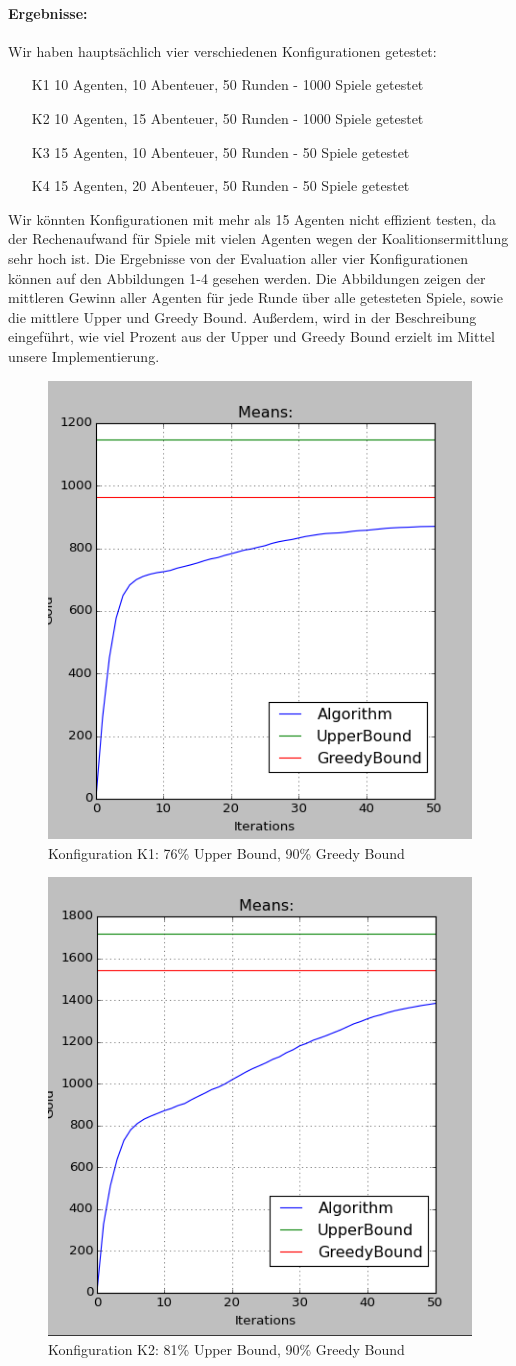 \documentclass[fleqn,10pt]{SelfArx} %
\begin{document}
\paragraph{Ergebnisse:}
Wir haben hauptsächlich vier verschiedenen Konfigurationen getestet:
\begin{itemize}
  \item[K1] 10 Agenten, 10 Abenteuer, 50 Runden - 1000 Spiele getestet
  \item[K2] 10 Agenten, 15 Abenteuer, 50 Runden - 1000 Spiele getestet
  \item[K3] 15 Agenten, 10 Abenteuer, 50 Runden - 50 Spiele getestet
  \item[K4] 15 Agenten, 20 Abenteuer, 50 Runden - 50 Spiele getestet
\end{itemize}
Wir könnten Konfigurationen mit mehr als 15 Agenten nicht effizient testen, da der Rechenaufwand für Spiele mit vielen Agenten wegen der Koalitionsermittlung sehr hoch ist. Die Ergebnisse von der Evaluation aller vier Konfigurationen können auf den Abbildungen 1-4 gesehen werden. Die Abbildungen zeigen der mittleren Gewinn aller Agenten für jede Runde über alle getesteten Spiele, sowie die mittlere Upper und Greedy Bound. Außerdem, wird in der Beschreibung eingeführt, wie viel Prozent aus der Upper und Greedy Bound erzielt im Mittel unsere Implementierung.
\begin{figure}
  \centering
  \includegraphics[width=.4\textwidth]{10ad_50r_1000it_cut.png}
  \caption{Konfiguration K1: 76\% Upper Bound, 90\% Greedy Bound}
\end{figure}
\label{fig:eval1}
\begin{figure}
  \centering
  \includegraphics[width=.4\textwidth]{15ad_50r_1000it_cut.png}
  \caption{Konfiguration K2: 81\% Upper Bound, 90\% Greedy Bound}
\end{figure}
\end{document}
